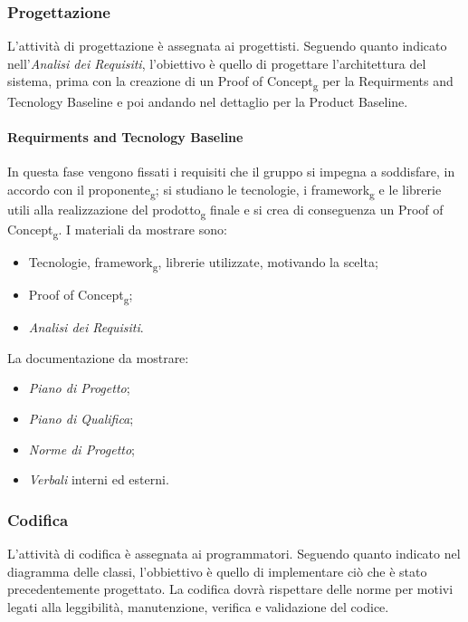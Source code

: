\subsubsection{Progettazione} 
L’attività di progettazione è assegnata ai progettisti. Seguendo quanto indicato 
nell’\textit{Analisi dei Requisiti}, l’obiettivo è quello di progettare l’architettura del sistema, 
prima con la creazione di un Proof of Concept\textsubscript{g} per la Requirments and Tecnology Baseline e poi andando 
nel dettaglio per la Product Baseline.

\paragraph{Requirments and Tecnology Baseline} 
In questa fase vengono fissati i requisiti che il gruppo si impegna a soddisfare, in accordo con il 
proponente\textsubscript{g}; si studiano le tecnologie, i framework\textsubscript{g} e le librerie utili alla realizzazione del 
prodotto\textsubscript{g} finale e si crea di conseguenza un Proof of Concept\textsubscript{g}. I materiali da mostrare sono:
    \begin{itemize}
        \item Tecnologie, framework\textsubscript{g}, librerie utilizzate, motivando la scelta;
        \item Proof of Concept\textsubscript{g};
        \item \textit{Analisi dei Requisiti}.
    \end{itemize}
La documentazione da mostrare:
    \begin{itemize}
        \item \textit{Piano di Progetto};
        \item \textit{Piano di Qualifica};
        \item \textit{Norme di Progetto};
        \item \textit{Verbali} interni ed esterni.
    \end{itemize}

\subsubsection{Codifica}
L’attività di codifica è assegnata ai programmatori. Seguendo quanto indicato nel diagramma delle classi, l'obbiettivo è quello di implementare ciò che è stato precedentemente progettato.
La codifica dovrà rispettare delle norme per motivi legati alla leggibilità, manutenzione, verifica e validazione del codice.
